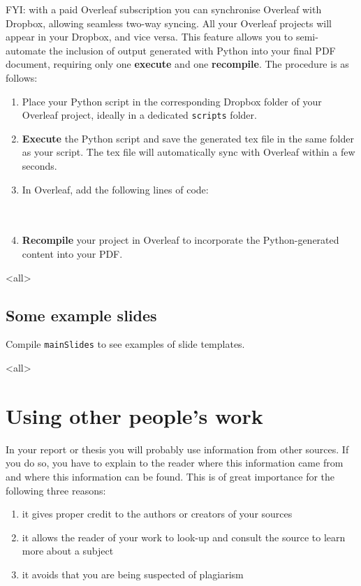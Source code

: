 FYI: with a paid Overleaf subscription you can synchronise Overleaf with Dropbox, allowing seamless two-way syncing. All your Overleaf projects will appear in your Dropbox, and vice versa. This feature allows you to semi-automate the inclusion of output generated with Python into your final PDF document, requiring only one \textbf{execute} and one \textbf{recompile}. The procedure is as follows:
\begin{enumerate}
    \item Place your Python script in the corresponding Dropbox folder of your Overleaf project, ideally in a dedicated \texttt{scripts} folder.
    \item \textbf{Execute} the Python script and save the generated tex file in the same folder as your script. The tex file will automatically sync with Overleaf within a few seconds.
    \item In Overleaf, add the following lines of code:\\
    \\
    \\
    \item \textbf{Recompile} your project in Overleaf to incorporate the Python-generated content into your PDF.
\end{enumerate}

\mode<all> %
\mode*     %

\subsection{Some example slides}
Compile \texttt{mainSlides} to see examples of slide templates.

\mode<all> %
\mode*     %


\section{Using other people's work}\label{sec:formatcites}
In your report or thesis you will probably use information from other sources. If you do so, you have to explain to the reader where this information came from and where this information can be found. This is of great importance for the following three reasons:
\begin{enumerate}
    \item it gives proper credit to the authors or creators of your sources
    \item it allows the reader of your work to look-up and consult the source to learn more about a subject
    \item it avoids that you are being suspected of plagiarism
\end{enumerate}

